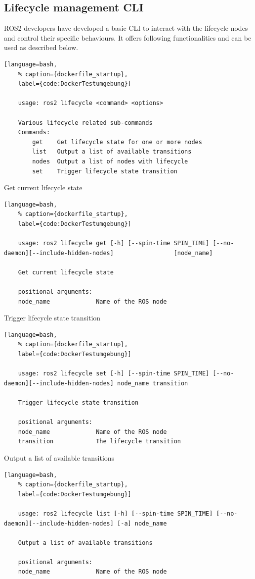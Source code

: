 \subsection{Lifecycle management CLI}
\label{Lifecycle management CLI}
 ROS2 developers have developed a basic CLI to interact with the lifecycle nodes and control their specific behaviours. 
It offers following functionalities and can be used as described below.
\begin{lstlisting}[language=bash,
	% caption={dockerfile_startup}, 
	label={code:DockerTestumgebung}]
	
	usage: ros2 lifecycle <command> <options>

	Various lifecycle related sub-commands
	Commands:
		get    Get lifecycle state for one or more nodes
		list   Output a list of available transitions
		nodes  Output a list of nodes with lifecycle
		set    Trigger lifecycle state transition
\end{lstlisting}

Get current lifecycle state
\begin{lstlisting}[language=bash,
	% caption={dockerfile_startup}, 
	label={code:DockerTestumgebung}]
	
	usage: ros2 lifecycle get [-h] [--spin-time SPIN_TIME] [--no-daemon][--include-hidden-nodes]                 [node_name]

	Get current lifecycle state
	
	positional arguments:
	node_name             Name of the ROS node
\end{lstlisting}

Trigger lifecycle state transition
\begin{lstlisting}[language=bash,
	% caption={dockerfile_startup}, 
	label={code:DockerTestumgebung}]
	
	usage: ros2 lifecycle set [-h] [--spin-time SPIN_TIME] [--no-daemon][--include-hidden-nodes] node_name transition

	Trigger lifecycle state transition

	positional arguments:
	node_name             Name of the ROS node
	transition            The lifecycle transition
\end{lstlisting}

Output a list of available transitions
\begin{lstlisting}[language=bash,
	% caption={dockerfile_startup}, 
	label={code:DockerTestumgebung}]
	
	usage: ros2 lifecycle list [-h] [--spin-time SPIN_TIME] [--no-daemon][--include-hidden-nodes] [-a] node_name

	Output a list of available transitions

	positional arguments:
	node_name             Name of the ROS node
	
\end{lstlisting}

